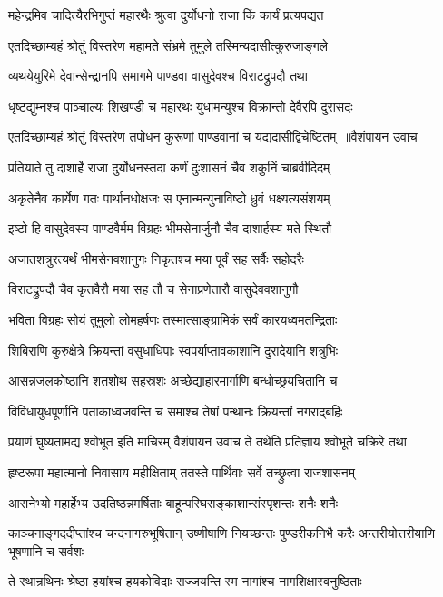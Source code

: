 \twolineshloka
{महेन्द्रमिव चादित्यैरभिगुप्तं महारथैः}
{श्रुत्वा दुर्योधनो राजा किं कार्यं प्रत्यपद्यत}


\twolineshloka
{एतदिच्छाम्यहं श्रोतुं विस्तरेण महामते}
{संभ्रमे तुमुले तस्मिन्यदासीत्कुरुजाङ्गले}


\twolineshloka
{व्यथयेयुरिमे देवान्सेन्द्रानपि समागमे}
{पाण्डवा वासुदेवश्च विराटद्रुपदौ तथा}


\twolineshloka
{धृष्टद्युम्नश्च पाञ्चाल्यः शिखण्डी च महारथः}
{युधामन्युश्च विक्रान्तो देवैरपि दुरासदः}


\threelineshloka
{एतदिच्छाम्यहं श्रोतुं विस्तरेण तपोधन}
{कुरूणां पाण्डवानां च यद्यदासीद्विचेष्टितम् ॥वैशंपायन उवाच}
{}


\twolineshloka
{प्रतियाते तु दाशार्हे राजा दुर्योधनस्तदा}
{कर्णं दुःशासनं चैव शकुनिं चाब्रवीदिदम्}


\twolineshloka
{अकृतेनैव कार्येण गतः पार्थानधोक्षजः}
{स एनान्मन्युनाविष्टो ध्रुवं धक्ष्यत्यसंशयम्}


\twolineshloka
{इष्टो हि वासुदेवस्य पाण्डवैर्मम विग्रहः}
{भीमसेनार्जुनौ चैव दाशार्हस्य मते स्थितौ}


\twolineshloka
{अजातशत्रुरत्यर्थं भीमसेनवशानुगः}
{निकृतश्च मया पूर्वं सह सर्वैः सहोदरैः}


\twolineshloka
{विराटद्रुपदौ चैव कृतवैरौ मया सह}
{तौ च सेनाप्रणेतारौ वासुदेववशानुगौ}


\twolineshloka
{भविता विग्रहः सोयं तुमुलो लोमहर्षणः}
{तस्मात्साङ्ग्रामिकं सर्वं कारयध्वमतन्द्रिताः}


\twolineshloka
{शिबिराणि कुरुक्षेत्रे क्रियन्तां वसुधाधिपाः}
{स्वपर्याप्तावकाशानि दुरादेयानि शत्रुभिः}


\threelineshloka
{आसन्नजलकोष्ठानि शतशोथ सहस्रशः}
{अच्छेद्याहारमार्गाणि बन्धोच्छ्रयचितानि च}
{}


\twolineshloka
{विविधायुधपूर्णानि पताकाध्वजवन्ति च}
{समाश्च तेषां पन्थानः क्रियन्तां नगराद्बहिः}


\threelineshloka
{प्रयाणं घुष्यतामद्य श्वोभूत इति माचिरम्}
{वैशंपायन उवाच}
{ते तथेति प्रतिज्ञाय श्वोभूते चक्रिरे तथा}


\twolineshloka
{हृष्टरूपा महात्मानो निवासाय महीक्षिताम्}
{ततस्ते पार्थिवाः सर्वे तच्छ्रुत्वा राजशासनम्}


\twolineshloka
{आसनेभ्यो महार्हेभ्य उदतिष्ठन्नमर्षिताः}
{बाहून्परिघसङ्काशान्संस्पृशन्तः शनैः शनैः}


\threelineshloka
{काञ्चनाङ्गददीप्तांश्च चन्दनागरुभूषितान्}
{उष्णीषाणि नियच्छन्तः पुण्डरीकनिभै करैः}
{अन्तरीयोत्तरीयाणि भूषणानि च सर्वशः}


\twolineshloka
{ते रथान्रथिनः श्रेष्ठा हयांश्च हयकोविदाः}
{सज्जयन्ति स्म नागांश्च नागशिक्षास्वनुष्ठिताः}



